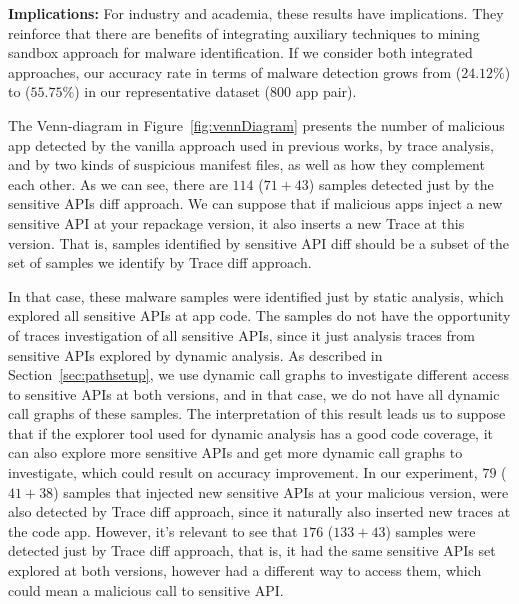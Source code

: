 \textbf{Implications: }For industry and academia, these results have implications. They reinforce that there are benefits of integrating auxiliary techniques to mining sandbox approach for malware identification. 
If we consider both integrated approaches, our accuracy rate in terms of malware detection grows from ($24.12\%$) to ($55.75\%$) in our representative dataset ($800$ app pair). %

The Venn-diagram in Figure~\ref{fig:vennDiagram} presents the number of malicious app detected by the vanilla approach used in previous works, by trace analysis, and by two kinds of suspicious manifest files, as well as how they complement each other. As we can see, there are $114$ ($71+43$) samples detected just by the sensitive APIs diff approach. We can suppose that if malicious apps inject a new sensitive API at your repackage version, it also inserts a new Trace at this version. That is, samples identified by sensitive API diff should be a subset of the set of samples we identify by Trace diff approach. 

In that case, these malware samples were identified just by static analysis, which explored all sensitive APIs at app code. The samples do not have the opportunity of traces investigation of all sensitive APIs, since it just analysis traces from sensitive APIs explored by dynamic analysis. As described in Section~\ref{sec:pathsetup}, we use dynamic call graphs to investigate different access to sensitive APIs at both versions, and in that case, we do not have all dynamic call graphs of these samples. The interpretation of this result leads us to suppose that if the explorer tool used for dynamic analysis has a good code coverage, it can also explore more sensitive APIs and get more dynamic call graphs to investigate, which could result on accuracy improvement. In our experiment, $79$ ($41+38$) samples that injected new sensitive APIs at your malicious version, were also detected by Trace diff approach, since it naturally also inserted new traces at the code app. However, it's relevant to see that $176$ ($133+43$) samples were detected just by Trace diff approach, that is, it had the same sensitive APIs set explored at both versions, however had a different way to access them, which could mean a malicious call to sensitive API.


